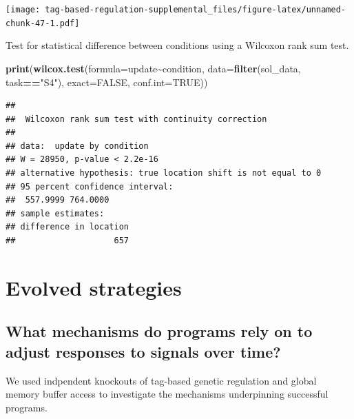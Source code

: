 \documentclass[
]{book}
\newenvironment{Shaded}{\begin{snugshade}}{\end{snugshade}}
\newcommand{\DataTypeTok}[1]{\textcolor[rgb]{0.13,0.29,0.53}{#1}}
\newcommand{\KeywordTok}[1]{\textcolor[rgb]{0.13,0.29,0.53}{\textbf{#1}}}
\newcommand{\NormalTok}[1]{#1}
\newcommand{\OperatorTok}[1]{\textcolor[rgb]{0.81,0.36,0.00}{\textbf{#1}}}
\newcommand{\OtherTok}[1]{\textcolor[rgb]{0.56,0.35,0.01}{#1}}
\newcommand{\StringTok}[1]{\textcolor[rgb]{0.31,0.60,0.02}{#1}}
\begin{document}
\texttt{[image: tag-based-regulation-supplemental\_files/figure-latex/unnamed-chunk-47-1.pdf]}

Test for statistical difference between conditions using a Wilcoxon rank sum test.

\begin{Shaded}
\begin{Highlighting}[]
\KeywordTok{print}\NormalTok{(}\KeywordTok{wilcox.test}\NormalTok{(}\DataTypeTok{formula=}\NormalTok{update}\OperatorTok{\textasciitilde{}}\NormalTok{condition, }\DataTypeTok{data=}\KeywordTok{filter}\NormalTok{(sol\_data, task}\OperatorTok{==}\StringTok{"S4"}\NormalTok{), }\DataTypeTok{exact=}\OtherTok{FALSE}\NormalTok{, }\DataTypeTok{conf.int=}\OtherTok{TRUE}\NormalTok{))}
\end{Highlighting}
\end{Shaded}

\begin{verbatim}
## 
##  Wilcoxon rank sum test with continuity correction
## 
## data:  update by condition
## W = 28950, p-value < 2.2e-16
## alternative hypothesis: true location shift is not equal to 0
## 95 percent confidence interval:
##  557.9999 764.0000
## sample estimates:
## difference in location 
##                    657
\end{verbatim}

\hypertarget{evolved-strategies}{%
\section{Evolved strategies}\label{evolved-strategies}}

\hypertarget{what-mechanisms-do-programs-rely-on-to-adjust-responses-to-signals-over-time}{%
\subsection{What mechanisms do programs rely on to adjust responses to signals over time?}\label{what-mechanisms-do-programs-rely-on-to-adjust-responses-to-signals-over-time}}

We used indpendent knockouts of tag-based genetic regulation and global memory buffer access to investigate the mechanisms underpinning successful programs.
\end{document}
